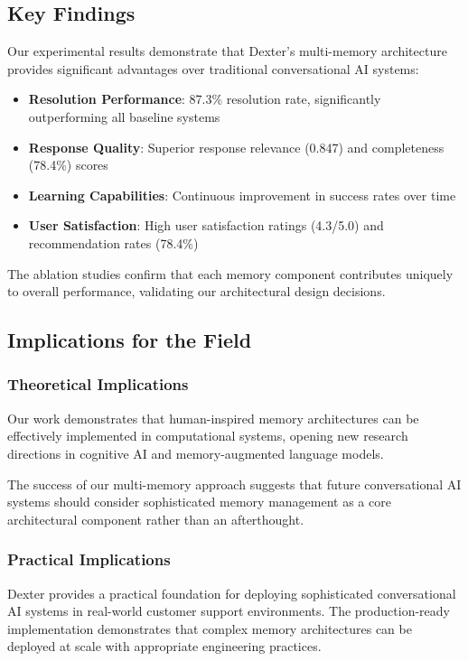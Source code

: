 \documentclass[11pt]{article}
\begin{document}
\subsection{Key Findings}

Our experimental results demonstrate that Dexter's multi-memory architecture provides significant advantages over traditional conversational AI systems:

\begin{itemize}
\item \textbf{Resolution Performance}: 87.3\% resolution rate, significantly outperforming all baseline systems
\item \textbf{Response Quality}: Superior response relevance (0.847) and completeness (78.4\%) scores
\item \textbf{Learning Capabilities}: Continuous improvement in success rates over time
\item \textbf{User Satisfaction}: High user satisfaction ratings (4.3/5.0) and recommendation rates (78.4\%)
\end{itemize}

The ablation studies confirm that each memory component contributes uniquely to overall performance, validating our architectural design decisions.

\subsection{Implications for the Field}

\subsubsection{Theoretical Implications}

Our work demonstrates that human-inspired memory architectures can be effectively implemented in computational systems, opening new research directions in cognitive AI and memory-augmented language models.

The success of our multi-memory approach suggests that future conversational AI systems should consider sophisticated memory management as a core architectural component rather than an afterthought.

\subsubsection{Practical Implications}

Dexter provides a practical foundation for deploying sophisticated conversational AI systems in real-world customer support environments. The production-ready implementation demonstrates that complex memory architectures can be deployed at scale with appropriate engineering practices.
\end{document}
